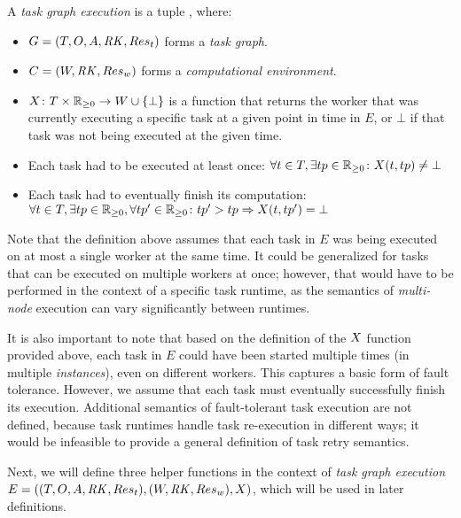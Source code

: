 \vspace{2mm} A \emph{task graph execution}
is a tuple \taskgraphexecution, where:
\begin{itemize}[itemsep=0pt]
	\item $G = (T, O, A, \mathit{RK}, Res_t)$ forms a \emph{task graph}.
	\item $C = (W, \mathit{RK}, Res_w)$ forms a \emph{computational environment}.
	\item $X\colon T \times \mathbb{R}_{\geq{}0} \rightarrow W \cup \{\bot\}$ is a
	function that returns the worker that was currently
	      executing a specific task at a given point in time in $E$, or $\bot$ if that task was not
	      being executed at the given time.
	\item Each task had to be executed at
	least once: $\forall t\in{}T, \exists tp\in\mathbb{R}_{\geq{}0}\colon X(t, tp) \neq \bot$
	\item Each task had to eventually finish its computation: \vspace{1mm}\\
	$\forall t\in{}T, \exists tp\in\mathbb{R}_{\geq{}0}, \forall tp'\in\mathbb{R}_{\geq{}0}\colon tp' > tp \Rightarrow X(t, tp') = \bot$
\end{itemize}

Note that the definition above assumes that each task in $E$ was being executed on at most a
single worker at the same time. It could be generalized for tasks that can be executed on multiple
workers at once; however, that would have to be performed in the context of a specific task runtime,
as the semantics of \emph{multi-node} execution can vary significantly between runtimes.

It is also important to note that based on the definition of the $X$
function provided above, each task in $E$ could have been started multiple times (in multiple
\emph{instances}), even on different workers. This captures a basic form of fault tolerance.
However, we assume that each task must eventually successfully finish its execution. Additional
semantics of fault-tolerant task execution are not defined, because task runtimes handle task
re-execution in different ways; it would be infeasible to provide a general definition of task
retry semantics.

Next, we will define three helper functions in the context of \emph{task graph execution} \\
$E = ((T, O, A, \mathit{RK}, Res_t), (W, \mathit{RK}, Res_w), X)$, which will be
used in later definitions.

